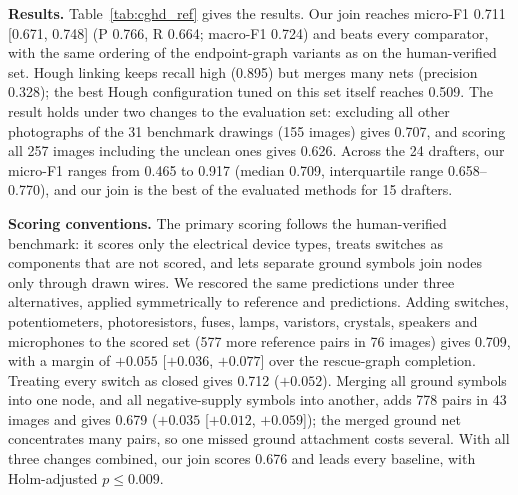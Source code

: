 \documentclass{ieeeaccess}
\begin{document}
\textbf{Results.} Table~\ref{tab:cghd_ref} gives the results. Our join reaches micro-F1 0.711 [0.671, 0.748] (P 0.766, R 0.664; macro-F1 0.724) and beats every comparator, with the same ordering of the endpoint-graph variants as on the human-verified set. Hough linking keeps recall high (0.895) but merges many nets (precision 0.328); the best Hough configuration tuned on this set itself reaches 0.509. The result holds under two changes to the evaluation set: excluding all other photographs of the 31 benchmark drawings (155 images) gives 0.707, and scoring all 257 images including the unclean ones gives 0.626. Across the 24 drafters, our micro-F1 ranges from 0.465 to 0.917 (median 0.709, interquartile range 0.658--0.770), and our join is the best of the evaluated methods for 15 drafters.

\textbf{Scoring conventions.} The primary scoring follows the human-verified benchmark: it scores only the electrical device types, treats switches as components that are not scored, and lets separate ground symbols join nodes only through drawn wires. We rescored the same predictions under three alternatives, applied symmetrically to reference and predictions. Adding switches, potentiometers, photoresistors, fuses, lamps, varistors, crystals, speakers and microphones to the scored set (577 more reference pairs in 76 images) gives 0.709, with a margin of $+0.055$ [$+0.036$, $+0.077$] over the rescue-graph completion. Treating every switch as closed gives 0.712 ($+0.052$). Merging all ground symbols into one node, and all negative-supply symbols into another, adds 778 pairs in 43 images and gives 0.679 ($+0.035$ [$+0.012$, $+0.059$]); the merged ground net concentrates many pairs, so one missed ground attachment costs several. With all three changes combined, our join scores 0.676 and leads every baseline, with Holm-adjusted $p\le0.009$.
\end{document}
